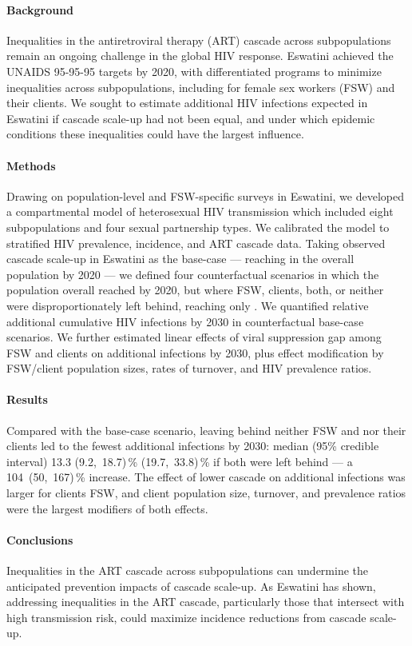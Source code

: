 \paragraph{Background}
Inequalities in the antiretroviral therapy (ART) cascade across subpopulations
remain an ongoing challenge in the global HIV response.
Eswatini achieved the UNAIDS 95-95-95 targets by 2020,
with differentiated programs to minimize inequalities across subpopulations,
including for female sex workers (FSW) and their clients.
We sought to estimate additional HIV infections expected in Eswatini
if cascade scale-up had not been equal,
and under which epidemic conditions these inequalities could have the largest influence.
\paragraph{Methods}
Drawing on population-level and FSW-specific surveys in Eswatini,
we developed a compartmental model of heterosexual HIV transmission
which included eight subpopulations and four sexual partnership types.
We calibrated the model to stratified HIV prevalence, incidence, and ART cascade data.
Taking observed cascade scale-up in Eswatini as the base-case
--- reaching \cashi in the overall population by 2020 ---
we defined four counterfactual scenarios in which
the population overall reached \casmd by 2020,
but where FSW, clients, both, or neither
were disproportionately left behind, reaching only \caslo.
We quantified relative additional cumulative HIV infections by 2030
in counterfactual \vs base-case scenarios.
We further estimated linear effects of
viral suppression gap among FSW and clients on additional infections by 2030, plus
effect modification by FSW/client population sizes, rates of turnover, and HIV prevalence ratios.
\paragraph{Results}
Compared with the base-case scenario, leaving behind neither FSW and nor their clients
led to the fewest additional infections by 2030: median (95\% credible interval)
13.3 (9.2,~18.7)\,\%  (19.7,~33.8)\,\% if both were left behind
--- a 104~(50,~167)\,\% increase.
The effect of lower cascade on additional infections was larger for clients \vs FSW, and
client population size, turnover, and prevalence ratios were the largest modifiers of both effects.
\paragraph{Conclusions}
Inequalities in the ART cascade across subpopulations
can undermine the anticipated prevention impacts of cascade scale-up.
As Eswatini has shown,
addressing inequalities in the ART cascade,
particularly those that intersect with high transmission risk,
could maximize incidence reductions from cascade scale-up.

